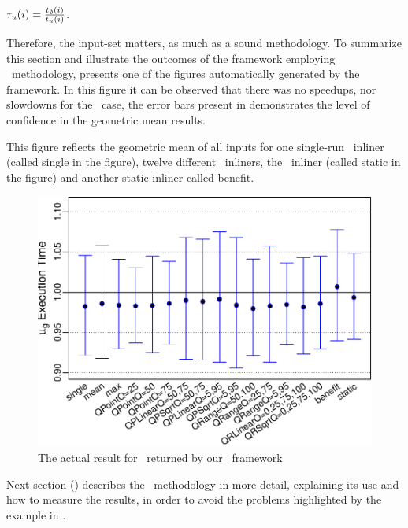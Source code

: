 $\tau_u(i) = \frac{t_\emptyset(i)}{t_u(i)}$.

Therefore, the input-set matters, as much as a sound methodology. To summarize this section and illustrate the outcomes of the framework employing \CP\ methodology,  presents one of the figures automatically generated by the framework. In this figure it can be observed that there was no speedups, nor slowdowns for the \gcc\ case, the error bars present in  demonstrates the level of confidence in the geometric mean results.

This figure reflects the geometric mean of all inputs for one single-run \FDI\ inliner (called single in the figure), twelve different \FDI\ inliners, the \llvm\ inliner (called static in the figure) and another static inliner called benefit.

\begin{figure}
  \centering
  \includegraphics[width=1.00\linewidth]{Figures/gcc-results}
  \caption{The actual result for \gcc\ returned by our \CP\ framework}
  \label{fig:gcc-results}
\end{figure}


Next section () describes the \CP\ methodology in more detail, explaining its use and how to measure the results, in order to avoid the problems highlighted by the example in .
